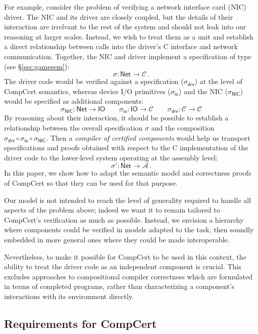 \documentclass[acmsmall,authordraft]{acmart}
\newcommand{\kw}[1]{\ensuremath{ \mathsf{#1} }}
\begin{document}
For example,
consider the problem of verifying
a network interface card (NIC) driver.
The NIC and its driver are closely coupled,
but the details of their interaction
are irrelvant to the rest of the system
and should not leak into our reasoning at larger scales.
Instead,
we wish to treat them as a unit
and establish a direct relationship between calls into
the driver's C interface and network communication.
Together, the NIC and driver implement
a specification of type (see \S\ref{sec:gamesem}):
\[
  \sigma : \kw{Net} \rightarrow \mathcal{C} \,.
\]
The driver code would be verified against a specification
($\sigma_\kw{drv}$)
at the level of CompCert semantics,
whereas device I/O primitives
($\sigma_\kw{io}$)
and the NIC
($\sigma_\kw{NIC}$)
would be specified as additional components:
\[
  \sigma_\kw{NIC} : \kw{Net} \rightarrow \kw{IO}
  \qquad
  \sigma_\kw{io} : \kw{IO} \rightarrow \mathcal{C}
  \qquad
  \sigma_\kw{drv} : \mathcal{C} \rightarrow \mathcal{C}
\]
By reasoning about their interaction,
it should be possible to establish a relationship between
the overall specification $\sigma$ and
the composition
$\sigma_\kw{drv} \circ \sigma_\kw{io} \circ \sigma_\kw{NIC}$.
Then a \emph{compiler of certified components}
would help us transport specifications and proofs
obtained with respect to the C implementation of the driver code
to the lower-level system operating at the assembly level:
\[
  \sigma' : \kw{Net} \rightarrow \mathcal{A} \,.
\]
In this paper, we show how to adapt
the semantic model and correctness proofs of CompCert
so that they can be used for that purpose.

Our model is not intended to reach the level of generality
required to handle all aspects of the problem above;
indeed we want it to remain tailored to CompCert's
verification as much as possible.
Instead, we envision a hierarchy
where components could be verified in models
adapted to the task,
then soundly embedded in more general ones
where they could be made interoperable.

Nevertheless,
to make it possible for CompCert to be used in this context,
the ability to treat the driver code as an
independent component is crucial.
This excludes approaches to
compositional compiler correctness
which are formulated in terms of completed programs,
rather than characterizing a component's interactions
with its environment directly.

\subsection{Requirements for CompCert}
\end{document}
